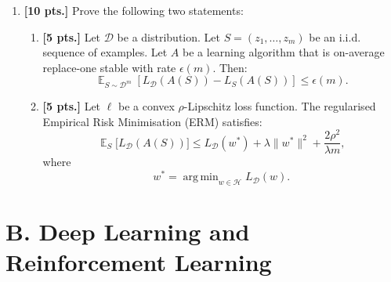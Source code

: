 \documentclass[11pt,a4paper]{article}
\DeclareMathOperator*{\argmin}{arg\,min}
\DeclareMathOperator{\E}{\mathbb{E}}
\begin{document}
\begin{enumerate}[label=\textbf{\arabic*.}]
    \item \textbf{[10 pts.]} Prove the following two statements:
    \begin{enumerate}[label=(\a*)]
        \item \textbf{[5 pts.]} Let $\mathcal{D}$ be a distribution. Let $S = (z_1, \dots, z_m)$ be an i.i.d. sequence of examples. Let $A$ be a learning algorithm that is on-average replace-one stable with rate $\epsilon(m)$. Then:
        \[
        \E_{S \sim \mathcal{D}^m} \left[ L_{\mathcal{D}}(A(S)) - L_S(A(S)) \right] \le \epsilon(m).
        \]
        \item \textbf{[5 pts.]} Let $\ell$ be a convex $\rho$-Lipschitz loss function. The regularised Empirical Risk Minimisation (ERM) satisfies:
        \[
        \E_S \bigl[ L_{\mathcal{D}}(A(S)) \bigr] \le L_{\mathcal{D}}(w^*) + \lambda \|w^*\|^2 + \frac{2\rho^2}{\lambda m},
        \]
        where
        \[
        w^* = \argmin_{w \in \mathcal{H}} L_{\mathcal{D}}(w).
        \]
    \end{enumerate}
\end{enumerate}

\section*{B. Deep Learning and Reinforcement Learning}
\end{document}
